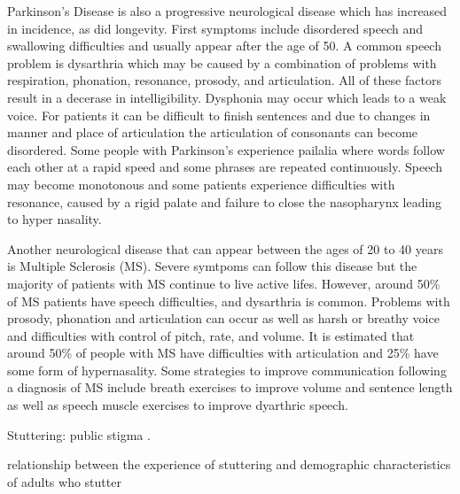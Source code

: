 Parkinson's Disease is also a progressive neurological disease which has increased in incidence, as did longevity. First symptoms include disordered speech and swallowing difficulties and usually appear after the age of 50. A common speech problem is dysarthria which may be caused by a combination of problems with respiration, phonation, resonance, prosody, and articulation. All of these factors result in a decerase in intelligibility. Dysphonia may occur which leads to a weak voice. For patients it can be difficult to finish sentences and due to changes in manner and place of articulation the articulation of consonants can become disordered. Some people with Parkinson's experience pailalia where words follow each other at a rapid speed and some phrases are repeated continuously. Speech may become monotonous and some patients experience difficulties with resonance, caused by a rigid palate and failure to close the nasopharynx leading to hyper nasality.\cite{communicationDifficulties}

Another neurological disease that can appear between the ages of 20 to 40 years is Multiple Sclerosis (MS). Severe symtpoms can follow this disease but the majority of patients with MS continue to live active lifes. However, around 50\% of MS patients have speech difficulties, and dysarthria is common. 
Problems with prosody, phonation and articulation can occur as well as harsh or breathy voice and difficulties with control of pitch, rate, and volume. It is estimated that around 50\% of people with MS have difficulties with
articulation and 25\% have some form of hypernasality. Some strategies to improve communication following a diagnosis of MS include breath exercises to improve volume and sentence length as well as speech muscle exercises to improve dyarthric speech. \cite{communicationDifficulties}




Stuttering: public stigma \cite{Boyle2016}.

relationship between the experience of stuttering and demographic characteristics of adults who stutter\cite{Freud2017}

